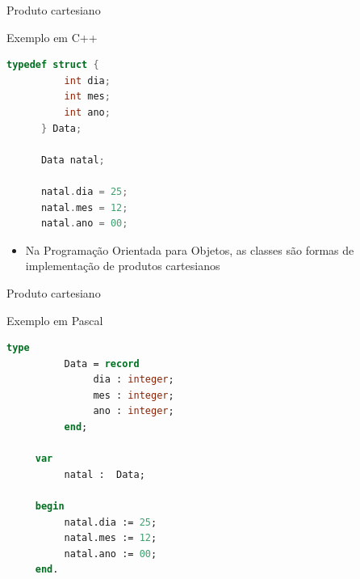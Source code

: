 \documentclass[handout]{beamer}
\begin{document}
\begin{frame}[fragile]{Produto cartesiano}

\begin{block}{Exemplo em C++ }
	\begin{lstlisting}[language=C,numbers=none]
      typedef struct {
          int dia;
          int mes;
          int ano;
      } Data;

      Data natal;

      natal.dia = 25;
      natal.mes = 12;
      natal.ano = 00;
	\end{lstlisting}
\end{block}

\begin{itemize}
	\item Na Programação Orientada para Objetos, as classes são formas de implementação de produtos cartesianos
\end{itemize}

\end{frame}


\begin{frame}[fragile]{Produto cartesiano}

\begin{block}{Exemplo em Pascal}
	\begin{lstlisting}[language=Pascal,numbers=none]
     type
          Data = record
               dia : integer;
               mes : integer;
               ano : integer;
          end;

     var
          natal :  Data;

     begin
          natal.dia := 25;
          natal.mes := 12;
          natal.ano := 00;
     end.
	\end{lstlisting}
\end{block}


\end{frame}
\end{document}
